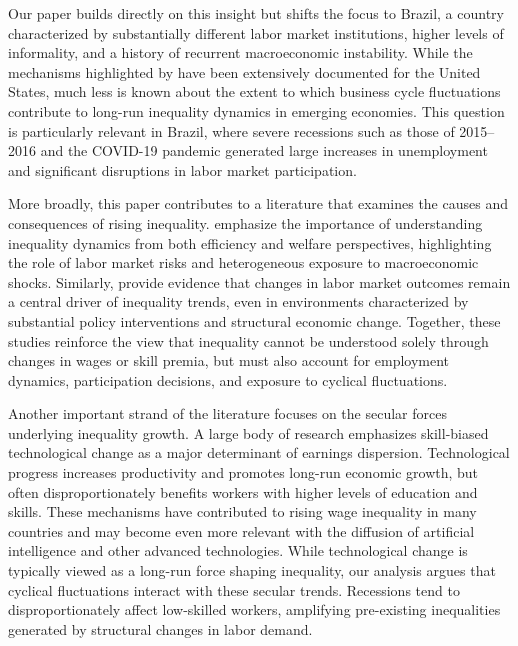 \documentclass[12pt]{article}
\newcommand{\citeonline}[1]{\citet{#1}}
\begin{document}
	Our paper builds directly on this insight but shifts the focus to Brazil, a country characterized by substantially different labor market institutions, higher levels of informality, and a history of recurrent macroeconomic instability. While the mechanisms highlighted by \citeonline{heathcote2020rise} have been extensively documented for the United States, much less is known about the extent to which business cycle fluctuations contribute to long-run inequality dynamics in emerging economies. This question is particularly relevant in Brazil, where severe recessions such as those of 2015–2016 and the COVID-19 pandemic generated large increases in unemployment and significant disruptions in labor market participation.
	
	More broadly, this paper contributes to a literature that examines the causes and consequences of rising inequality. \citeonline{storesletten2020should} emphasize the importance of understanding inequality dynamics from both efficiency and welfare perspectives, highlighting the role of labor market risks and heterogeneous exposure to macroeconomic shocks. Similarly, \citeonline{heathcote2023more} provide evidence that changes in labor market outcomes remain a central driver of inequality trends, even in environments characterized by substantial policy interventions and structural economic change. Together, these studies reinforce the view that inequality cannot be understood solely through changes in wages or skill premia, but must also account for employment dynamics, participation decisions, and exposure to cyclical fluctuations.
	
	Another important strand of the literature focuses on the secular forces underlying inequality growth. A large body of research emphasizes skill-biased technological change as a major determinant of earnings dispersion. Technological progress increases productivity and promotes long-run economic growth, but often disproportionately benefits workers with higher levels of education and skills. These mechanisms have contributed to rising wage inequality in many countries and may become even more relevant with the diffusion of artificial intelligence and other advanced technologies. While technological change is typically viewed as a long-run force shaping inequality, our analysis argues that cyclical fluctuations interact with these secular trends. Recessions tend to disproportionately affect low-skilled workers, amplifying pre-existing inequalities generated by structural changes in labor demand.
	
\end{document}
